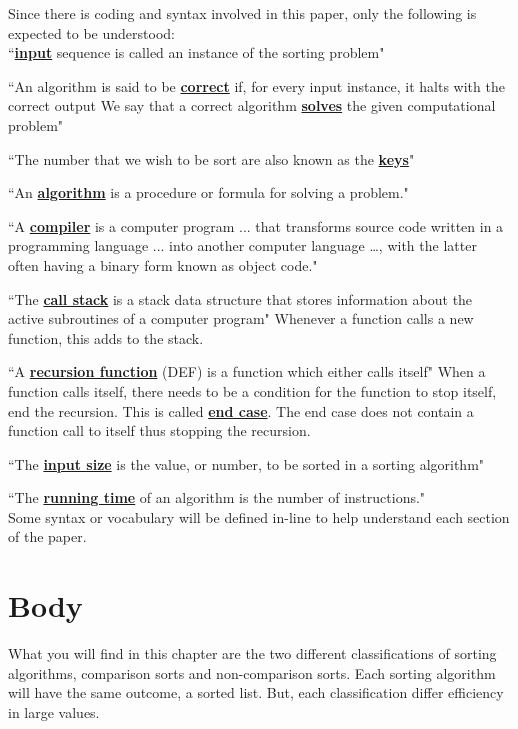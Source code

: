 \documentclass[12pt]{article}
\begin{document}
	Since there is coding and syntax involved in this paper, only the following is expected to be understood:\\
	
	``\textbf{\underline{input}} sequence is called an instance of the sorting problem"\cite[p.~5]{intro}
	
	``An algorithm is said to be \textbf{\underline{correct}} if, for every input instance, it halts with the correct output
	We say that a correct algorithm \textbf{\underline{solves}} the given computational problem"\cite[p.~6]{intro}
	
	``The number that we wish to be sort are also known as the \textbf{\underline{keys}}"\cite[p.~16]{intro}
	
	``An \textbf{\underline{algorithm}} is a procedure or formula for solving a problem."\cite{intro}
	
	``A \textbf{\underline{compiler}} is a computer program ... that transforms source code written in a programming language ... into another computer language …, with the latter often having a binary form known as object code."\cite{intro}
	
	``The \textbf{\underline{call stack}} is a stack data structure that stores information about the active subroutines of a computer program"\cite{wiki-callStack} Whenever a function calls a new function, this adds to the stack.
	
	``A \textbf{\underline{recursion function}} (DEF) is a function which either calls itself"\cite{wiki-recursiveFunction} When a function calls itself, there needs to be a condition for the function to stop itself, end the recursion.
	This is called \textbf{\underline{end case}}.
	The end case does not contain a function call to itself thus stopping the recursion.
	
	``The \textbf{\underline{input size}} is the value, or number, to be sorted in a sorting algorithm"\cite{intro}
	
	``The \textbf{\underline{running time}} of an algorithm is the number of instructions."\cite{intro}\\
	
	Some syntax or vocabulary will be defined in-line to help understand each section of the paper.
	
	\section{Body}
	
	What you will find in this chapter are the two different classifications of sorting algorithms, comparison sorts and non-comparison sorts.
	Each sorting algorithm will have the same outcome, a sorted list.
	But, each classification differ efficiency in large values.
	
\end{document}
